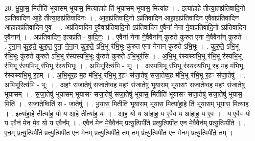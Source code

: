 \documentclass[17pt]{extarticle}
\begin{document}
20. भू॒या॒स॒ मितीति॑ भूयासम् भूयास॒ मित्या॑हा॒हे ति॑ भूयासम् भूयास॒ मित्या॑ह । . इत्या॑हा॒हे तीत्या॒हाप्र॑तिवादि॒नो ऽप्र॑तिवादिन आ॒हे तीत्या॒हाप्र॑तिवादिनः । . आ॒हाप्र॑तिवादि॒नो ऽप्र॑तिवादिन आहा॒हाप्र॑तिवादिन ए॒वैवाप्र॑तिवादिन आहा॒हाप्र॑तिवादिन ए॒व । . अप्र॑तिवादिन ए॒वैवाप्र॑तिवादि॒नो ऽप्र॑तिवादिन ए॒वैना॑ नेना ने॒वाप्र॑तिवादि॒नो ऽप्र॑तिवादिन ए॒वैनान्॑ । . अप्र॑तिवादिन॒ इत्यप्र॑ति - वा॒दि॒नः॒ । . ए॒वैना॑ नेना ने॒वैवैना᳚न् कुरुते कुरुत एना ने॒वैवैना᳚न् कुरुते । . ए॒ना॒न् कु॒रु॒ते॒ कु॒रु॒त॒ ए॒ना॒ ने॒ना॒न् कु॒रु॒ते॒ ऽभि॒भू र॑भि॒भूः कु॑रुत एना नेनान् कुरुते ऽभि॒भूः । . कु॒रु॒ते॒ ऽभि॒भू र॑भि॒भूः कु॑रुते कुरुते ऽभि॒भू र॑स्यस्यभि॒भूः कु॑रुते कुरुते ऽभि॒भूर॑सि । . अ॒भि॒भू र॑स्यस्यभि॒भू र॑भि॒भू र॑स्यभि॒भू र॑भि॒भू र॑स्यभि॒भू र॑भि॒भू र॑स्यभि॒भूः । . अ॒भि॒भूरित्य॑भि - भूः । . अ॒स्य॒भि॒भू र॑भि॒भू र॑स्यस्यभि॒भू र॒ह म॒ह म॑भि॒भू र॑स्यस्यभि॒भू र॒हम् । . अ॒भि॒भूर॒ह म॒ह म॑भि॒भू र॑भि॒भू र॒हꣳ स॑जा॒तेषु॑ सजा॒तेष्व॒ह म॑भि॒भू र॑भि॒भू र॒हꣳ स॑जा॒तेषु॑ । . अ॒भि॒भूरित्य॑भि - भूः । . अ॒हꣳ स॑जा॒तेषु॑ सजा॒तेष्व॒ह म॒हꣳ स॑जा॒तेषु॑ भूयासम् भूयासꣳ सजा॒तेष्व॒ह म॒हꣳ स॑जा॒तेषु॑ भूयासम् । . स॒जा॒तेषु॑ भूयासम् भूयासꣳ सजा॒तेषु॑ सजा॒तेषु॑ भूयास॒ मितीति॑ भूयासꣳ सजा॒तेषु॑ सजा॒तेषु॑ भूयास॒ मिति॑ । . स॒जा॒तेष्विति॑ स - जा॒तेषु॑ । . भू॒या॒स॒ मितीति॑ भूयासम् भूयास॒ मित्या॑हा॒हे ति॑ भूयासम् भूयास॒ मित्या॑ह । . इत्या॑हा॒हे तीत्या॑ह॒ यो य आ॒हे तीत्या॑ह॒ यः । . आ॒ह॒ यो य आ॑हाह॒ य ए॒वैव य आ॑हाह॒ य ए॒व । . य ए॒वैव यो य ए॒वैन॑ मेन मे॒व यो य ए॒वैन᳚म् । . ए॒वैन॑ मेन मे॒वैवैन॑म् प्रत्यु॒त्पिपी॑ते प्रत्यु॒त्पिपी॑त एन मे॒वैवैन॑म् प्रत्यु॒त्पिपी॑ते । . ए॒न॒म् प्र॒त्यु॒त्पिपी॑ते प्रत्यु॒त्पिपी॑त एन मेनम् प्रत्यु॒त्पिपी॑ते॒ तम् तम् प्र॑त्यु॒त्पिपी॑त एन मेनम् प्रत्यु॒त्पिपी॑ते॒ तम् । \newline
\end{document}
